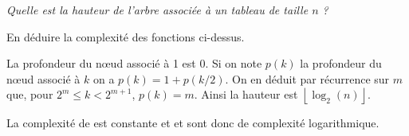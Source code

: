 \begin{Exercise}[title = Complexité]\it 
Quelle est la hauteur de l'arbre associée à un tableau de taille $n$ ?

En déduire la complexité des fonctions ci-dessus.
\end{Exercise}
\begin{Answer}
La profondeur du nœud associé à 1 est 0. Si on note $p(k)$ la profondeur du nœud associé à $k$ on a $p(k) = 1 + p(k/2)$. On en déduit par récurrence sur $m$ que, pour $2^m \le k < 2^{m+1}$, $p(k) = m$. Ainsi la hauteur est $\left\lfloor \log_2(n)\right\rfloor$.

La complexité de  est constante et  et  sont donc de complexité logarithmique. 
\end{Answer}
